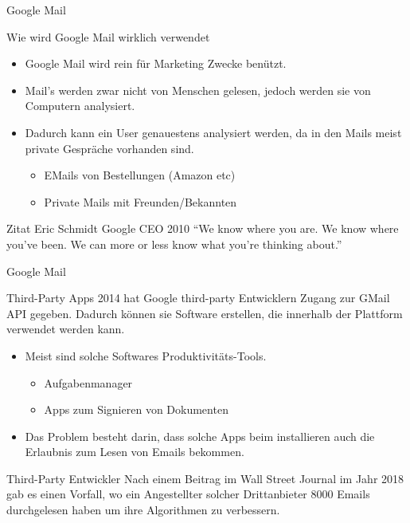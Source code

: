 \documentclass[11pt]{beamer}
\begin{document}
\begin{frame}{Google Mail}
    \begin{block}{Wie wird Google Mail wirklich verwendet}
    \begin{itemize}
        \item Google Mail wird rein für Marketing Zwecke benützt.
        \item Mail's werden zwar nicht von Menschen gelesen, jedoch werden sie von Computern analysiert.
        \item Dadurch kann ein User genauestens analysiert werden, da in den Mails meist private Gespräche vorhanden sind.
        \begin{itemize}
            \item EMails von Bestellungen (Amazon etc)
            \item Private Mails mit Freunden/Bekannten
        \end{itemize}
    \end{itemize}
    \end{block}
    \begin{alertblock}{Zitat Eric Schmidt Google CEO 2010}
    “We know where you are.  We know where you’ve been.
    We can more or less know what you’re thinking about.”
    \end{alertblock}
\end{frame}

\begin{frame}{Google Mail}
    \begin{block}{Third-Party Apps}
    2014 hat Google third-party Entwicklern Zugang zur GMail API gegeben. Dadurch     können sie Software erstellen, die innerhalb der Plattform verwendet werden     kann.
    \begin{itemize}
        \item Meist sind solche Softwares Produktivitäts-Tools. 
            \begin{itemize}
                \item Aufgabenmanager
                \item Apps zum Signieren von Dokumenten
            \end{itemize}
        \item Das Problem besteht darin, dass solche Apps beim installieren auch die Erlaubnis zum Lesen von Emails bekommen.
        \end{itemize}
    \end{block}
    \begin{alertblock}{Third-Party Entwickler}
    Nach einem Beitrag im Wall Street Journal im Jahr 2018 gab es einen Vorfall, wo ein Angestellter solcher Drittanbieter 8000 Emails durchgelesen haben um ihre Algorithmen zu verbessern.
    \end{alertblock}
\end{frame}
\end{document}
